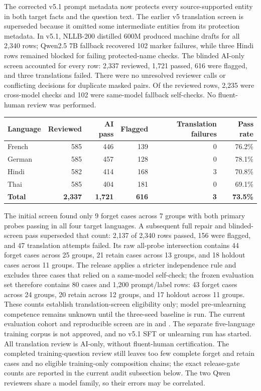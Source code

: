 \documentclass[10pt,a4paper]{article}
\begin{document}
The corrected v5.1 prompt metadata now protects every source-supported entity in both target facts and the question text. The earlier v5 translation screen is superseded because it omitted some intermediate entities from its protection metadata. In v5.1, NLLB-200 distilled 600M produced machine drafts for all 2,340 rows; Qwen2.5 7B fallback recovered 102 marker failures, while three Hindi rows remained blocked for failing protected-name checks. The blinded AI-only screen accounted for every row: 2,337 reviewed, 1,721 passed, 616 were flagged, and three translations failed. There were no unresolved reviewer calls or conflicting decisions for duplicate masked pairs. Of the reviewed rows, 2,235 were cross-model checks and 102 were same-model fallback self-checks. No fluent-human review was performed.

\begin{center}
\small
\begin{tabular}{lrrrrr}
\toprule
Language & Reviewed & AI pass & Flagged & Translation failures & Pass rate \\
\midrule
French & 585 & 446 & 139 & 0 & 76.2\% \\
German & 585 & 457 & 128 & 0 & 78.1\% \\
Hindi & 582 & 414 & 168 & 3 & 70.8\% \\
Thai & 585 & 404 & 181 & 0 & 69.1\% \\
\textbf{Total} & \textbf{2,337} & \textbf{1,721} & \textbf{616} & \textbf{3} & \textbf{73.5\%} \\
\bottomrule
\end{tabular}
\end{center}

The initial screen found only 9 forget cases across 7 groups with both primary probes passing in all four target languages. A subsequent full repair and blinded-screen pass superseded that count: 2,137 of 2,340 rows passed, 156 were flagged, and 47 translation attempts failed. Its raw all-probe intersection contains 44 forget cases across 25 groups, 21 retain cases across 13 groups, and 18 holdout cases across 11 groups. The release applies a stricter independence rule and excludes three cases that relied on a same-model self-check; the frozen evaluation set therefore contains 80 cases and 1,200 prompt/label rows: 43 forget cases across 24 groups, 20 retain across 12 groups, and 17 holdout across 11 groups. These counts establish translation-screen eligibility only; model pre-unlearning competence remains unknown until the three-seed baseline is run. The current evaluation cohort and reproducible screen are in  and . The separate five-language training corpus is not approved, and no v5.1 SFT or unlearning run has started. All translation review is AI-only, without fluent-human certification. The completed training-question review still leaves too few complete forget and retain cases and no eligible training-only composition chains; the exact release-gate counts are reported in the current audit subsection below. The two Qwen reviewers share a model family, so their errors may be correlated.
\end{document}
